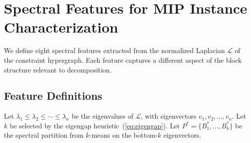\documentclass[12pt]{article}
\begin{document}
\section{Spectral Features for MIP Instance Characterization}
\label{sec:features}

We define eight spectral features extracted from the normalized Laplacian
$\mathcal{L}$ of the constraint hypergraph.  Each feature captures a
different aspect of the block structure relevant to decomposition.

\subsection{Feature Definitions}
\label{sec:feature-defs}

Let $\lambda_1 \leq \lambda_2 \leq \cdots \leq \lambda_n$ be the eigenvalues of
$\mathcal{L}$, with eigenvectors $v_1, v_2, \ldots, v_n$.
Let $k$ be selected by the eigengap heuristic~(\ref{eq:eigengap}).
Let $P^* = \{B_1^*, \ldots, B_k^*\}$ be the spectral partition from
$k$-means on the bottom-$k$ eigenvectors.
\end{document}

